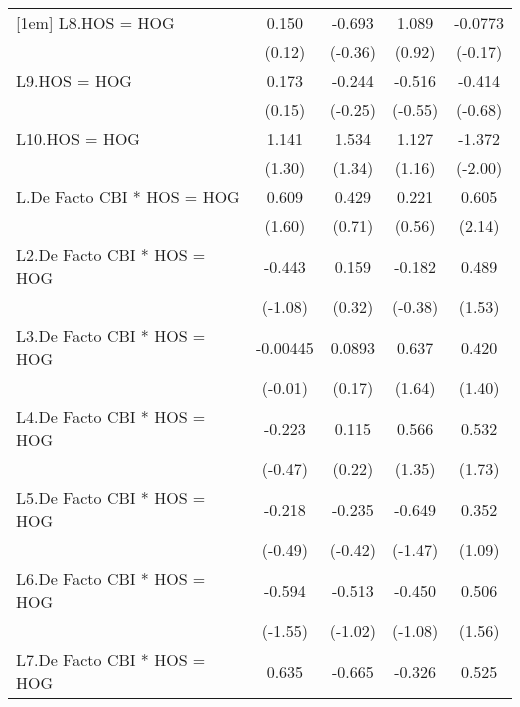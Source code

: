 {\begin{tabular}{l*{4}{c}}
[1em]
L8.HOS = HOG    &    0.150         &   -0.693         &    1.089         &  -0.0773         \\
                &   (0.12)         &  (-0.36)         &   (0.92)         &  (-0.17)         \\
[1em]
L9.HOS = HOG    &    0.173         &   -0.244         &   -0.516         &   -0.414         \\
                &   (0.15)         &  (-0.25)         &  (-0.55)         &  (-0.68)         \\
[1em]
L10.HOS = HOG   &    1.141         &    1.534         &    1.127         &   -1.372\sym{*}  \\
                &   (1.30)         &   (1.34)         &   (1.16)         &  (-2.00)         \\
[1em]
L.De Facto CBI * HOS = HOG&    0.609         &    0.429         &    0.221         &    0.605\sym{*}  \\
                &   (1.60)         &   (0.71)         &   (0.56)         &   (2.14)         \\
[1em]
L2.De Facto CBI * HOS = HOG&   -0.443         &    0.159         &   -0.182         &    0.489         \\
                &  (-1.08)         &   (0.32)         &  (-0.38)         &   (1.53)         \\
[1em]
L3.De Facto CBI * HOS = HOG& -0.00445         &   0.0893         &    0.637         &    0.420         \\
                &  (-0.01)         &   (0.17)         &   (1.64)         &   (1.40)         \\
[1em]
L4.De Facto CBI * HOS = HOG&   -0.223         &    0.115         &    0.566         &    0.532         \\
                &  (-0.47)         &   (0.22)         &   (1.35)         &   (1.73)         \\
[1em]
L5.De Facto CBI * HOS = HOG&   -0.218         &   -0.235         &   -0.649         &    0.352         \\
                &  (-0.49)         &  (-0.42)         &  (-1.47)         &   (1.09)         \\
[1em]
L6.De Facto CBI * HOS = HOG&   -0.594         &   -0.513         &   -0.450         &    0.506         \\
                &  (-1.55)         &  (-1.02)         &  (-1.08)         &   (1.56)         \\
[1em]
L7.De Facto CBI * HOS = HOG&    0.635         &   -0.665         &   -0.326         &    0.525         \\

\end{tabular}}
